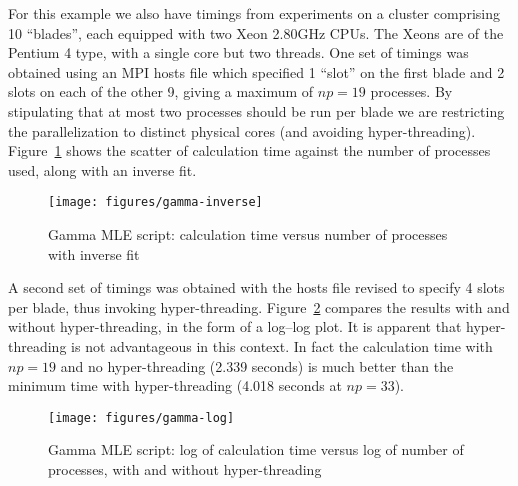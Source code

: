 \documentclass{article}
\begin{document}
For this example we also have timings from experiments on a cluster
comprising 10 ``blades'', each equipped with two Xeon 2.80GHz
CPUs. The Xeons are of the Pentium 4 type, with a single core but two
threads. One set of timings was obtained using an MPI hosts file which
specified 1 ``slot'' on the first blade and 2 slots on each of the
other 9, giving a maximum of $np=19$ processes. By stipulating that at
most two processes should be run per blade we are restricting the
parallelization to distinct physical cores (and avoiding
hyper-threading). Figure~\ref{fig:gamma-inverse} shows the scatter of
calculation time against the number of processes used, along with an
inverse fit.

\begin{figure}[htbp]
  \centering
  \texttt{[image: figures/gamma-inverse]}
  \caption{Gamma MLE script: calculation time versus number of
    processes with inverse fit}
  \label{fig:gamma-inverse}
\end{figure}

A second set of timings was obtained with the hosts file revised to
specify 4 slots per blade, thus invoking
hyper-threading. Figure~\ref{fig:gamma-log} compares the results with
and without hyper-threading, in the form of a log--log plot. It is
apparent that hyper-threading is not advantageous in this context.  In
fact the calculation time with $np=19$ and no hyper-threading (2.339
seconds) is much better than the minimum time with hyper-threading
(4.018 seconds at $np=33$).

\begin{figure}[htbp]
  \centering
  \texttt{[image: figures/gamma-log]}
  \caption{Gamma MLE script: log of calculation time versus log of
    number of processes, with and without hyper-threading}
  \label{fig:gamma-log}
\end{figure}
\end{document}
